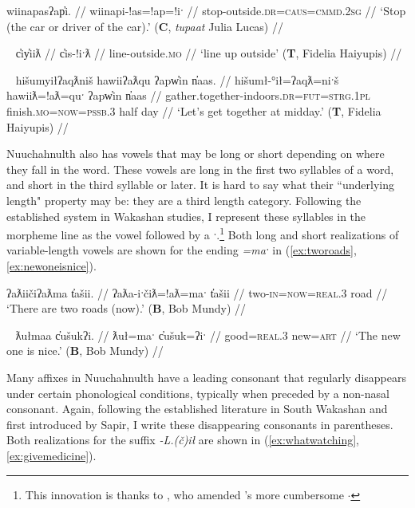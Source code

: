 \ex \label{ex:stopoutside}
\begingl
\glpreamble wiinapasʔap̓i. //
\gla wiinapi-!as=!ap=!iˑ //
\glb stop-outside.\textsc{dr}=\textsc{caus}=\textsc{cmmd.2sg} //
\glft `Stop (the car or driver of the car).' (\textbf{C}, \textit{tupaat} Julia Lucas) //
\endgl
\xe

\ex~ \label{ex:lineupoutside}
\begingl
\glpreamble c̓iy̓iiƛ //
\gla c̓is-!iˑƛ //
\glb line-outside.\textsc{mo} //
\glft `line up outside' (\textbf{T}, Fidelia Haiyupis) //
\endgl
\xe

\ex~ \label{ex:gatherindoors}
\begingl
\glpreamble hišumyiłʔaqƛniš hawiiʔaƛqu ʔapw̓in n̓aas. //
\gla hišumł-°ił=ʔaqƛ=niˑš hawiiƛ=!aƛ=quˑ ʔapw̓in n̓aas //
\glb gather.together-indoors.\textsc{dr}=\textsc{fut}=\textsc{strg.1pl} finish.\textsc{mo}=\textsc{now}=\textsc{pssb.3} half day //
\glft `Let's get together at midday.' (\textbf{T}, Fidelia Haiyupis) //
\endgl
\xe

Nuuchahnulth also has vowels that may be long or short depending on where they fall in the word. These vowels are long in the first two syllables of a word, and short in the third syllable or later. It is hard to say what their ``underlying length" property may be: they are a third length category. Following the established system in Wakashan studies, I represent these syllables in the morpheme line as the vowel followed by a ˑ.\footnote{This innovation is thanks to \citet{rose1981}, who amended \citet{sapir1939}'s more cumbersome \u{$\cdot$}} Both long and short realizations of variable-length vowels are shown for the ending \textit{=maˑ} in (\ref{ex:tworoads}, \ref{ex:newoneisnice}).

\ex \label{ex:tworoads}
\begingl
\glpreamble ʔaƛiičiʔaƛma t̓ašii. //
\gla ʔaƛa-iˑčiƛ=!aƛ=maˑ t̓ašii //
\glb two-\textsc{in}=\textsc{now}=\textsc{real.3} road //
\glft `There are two roads (now).' (\textbf{B}, Bob Mundy) //
\endgl
\xe

\ex~ \label{ex:newoneisnice}
\begingl
\glpreamble ƛułmaa c̓ušukʔi. //
\gla ƛuł=maˑ c̓ušuk=ʔiˑ //
\glb good=\textsc{real.3} new=\textsc{art} //
\glft `The new one is nice.' (\textbf{B}, Bob Mundy) //
\endgl
\xe

Many affixes in Nuuchahnulth have a leading consonant that regularly disappears under certain phonological conditions, typically when preceded by a non-nasal consonant. Again, following the established literature in South Wakashan and first introduced by Sapir, I write these disappearing consonants in parentheses. Both realizations for the suffix \textit{-L.(č)ił} are shown in (\ref{ex:whatwatching}, \ref{ex:givemedicine}).

